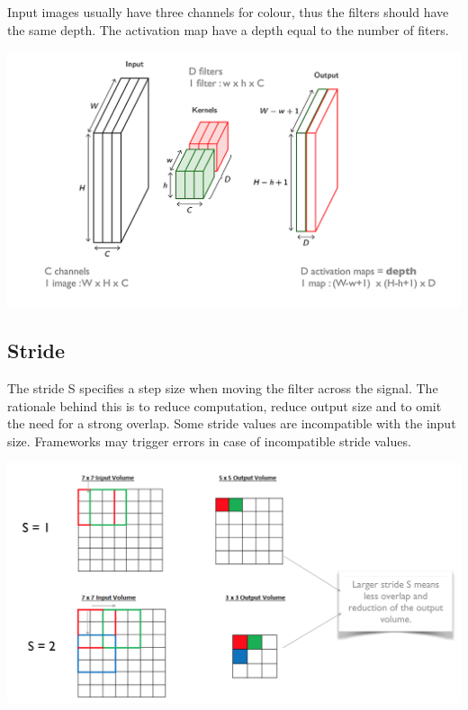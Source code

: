 \documentclass[11pt]{article}
\begin{document}
Input images usually have three channels for colour, thus the filters should have the same depth. The activation map have a depth equal to the number of fiters.
\begin{center}
	\includegraphics[width=0.8\linewidth]{img/convolutional_layer_kernels_depth}
\end{center}

\subsection{Stride}
The stride S specifies a step size when moving the filter across the signal. The rationale behind this is to reduce computation, reduce output size and to omit the need for a strong overlap. Some stride values are incompatible with the input size. Frameworks may trigger errors in case of incompatible stride values.

\begin{center}
	\includegraphics[width=0.6\linewidth]{img/convolutional_layer_kernels_stride}
\end{center}
\end{document}
